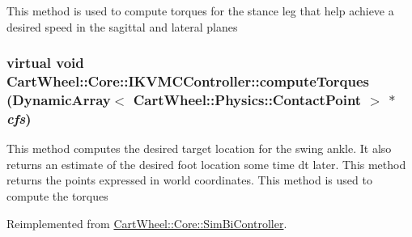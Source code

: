 \label{classCartWheel_1_1Core_1_1IKVMCController_af111c60309fbcb6bd5da03ac95b984f4}
This method is used to compute torques for the stance leg that help achieve a desired speed in the sagittal and lateral planes \hypertarget{classCartWheel_1_1Core_1_1IKVMCController_a0a944ad3c3178ecc74488c1697460883}{
\subsubsection[{computeTorques}]{\setlength{\rightskip}{0pt plus 5cm}virtual void CartWheel::Core::IKVMCController::computeTorques (DynamicArray$<$ {\bf CartWheel::Physics::ContactPoint} $>$ $\ast$ {\em cfs})}}
\label{classCartWheel_1_1Core_1_1IKVMCController_a0a944ad3c3178ecc74488c1697460883}
This method computes the desired target location for the swing ankle. It also returns an estimate of the desired foot location some time dt later. This method returns the points expressed in world coordinates. This method is used to compute the torques 

Reimplemented from \hyperlink{classCartWheel_1_1Core_1_1SimBiController_aa6510698f1e27b154ace8e9459080322}{CartWheel::Core::SimBiController}.

